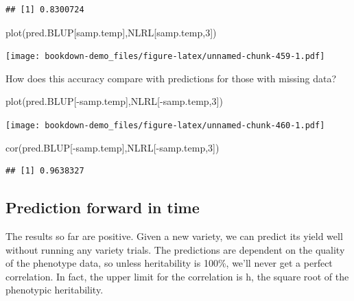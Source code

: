 \documentclass[
]{book}
\newenvironment{Shaded}{\begin{snugshade}}{\end{snugshade}}
\newcommand{\DecValTok}[1]{\textcolor[rgb]{0.00,0.00,0.81}{#1}}
\newcommand{\FunctionTok}[1]{\textcolor[rgb]{0.00,0.00,0.00}{#1}}
\newcommand{\NormalTok}[1]{#1}
\newcommand{\SpecialCharTok}[1]{\textcolor[rgb]{0.00,0.00,0.00}{#1}}
\begin{document}
\begin{verbatim}
## [1] 0.8300724
\end{verbatim}

\begin{Shaded}
\begin{Highlighting}[]
\FunctionTok{plot}\NormalTok{(pred.BLUP[samp.temp],NLRL[samp.temp,}\DecValTok{3}\NormalTok{])}
\end{Highlighting}
\end{Shaded}

\texttt{[image: bookdown-demo\_files/figure-latex/unnamed-chunk-459-1.pdf]}

How does this accuracy compare with predictions for those with missing data?

\begin{Shaded}
\begin{Highlighting}[]
\FunctionTok{plot}\NormalTok{(pred.BLUP[}\SpecialCharTok{{-}}\NormalTok{samp.temp],NLRL[}\SpecialCharTok{{-}}\NormalTok{samp.temp,}\DecValTok{3}\NormalTok{])}
\end{Highlighting}
\end{Shaded}

\texttt{[image: bookdown-demo\_files/figure-latex/unnamed-chunk-460-1.pdf]}

\begin{Shaded}
\begin{Highlighting}[]
\FunctionTok{cor}\NormalTok{(pred.BLUP[}\SpecialCharTok{{-}}\NormalTok{samp.temp],NLRL[}\SpecialCharTok{{-}}\NormalTok{samp.temp,}\DecValTok{3}\NormalTok{])}
\end{Highlighting}
\end{Shaded}

\begin{verbatim}
## [1] 0.9638327
\end{verbatim}

\hypertarget{prediction-forward-in-time}{%
\subsection{Prediction forward in time}\label{prediction-forward-in-time}}

The results so far are positive. Given a new variety, we can predict its yield well without running any variety trials. The predictions are dependent on the quality of the phenotype data, so unless heritability is 100\%, we'll never get a perfect correlation. In fact, the upper limit for the correlation is h, the square root of the phenotypic heritability.
\end{document}
